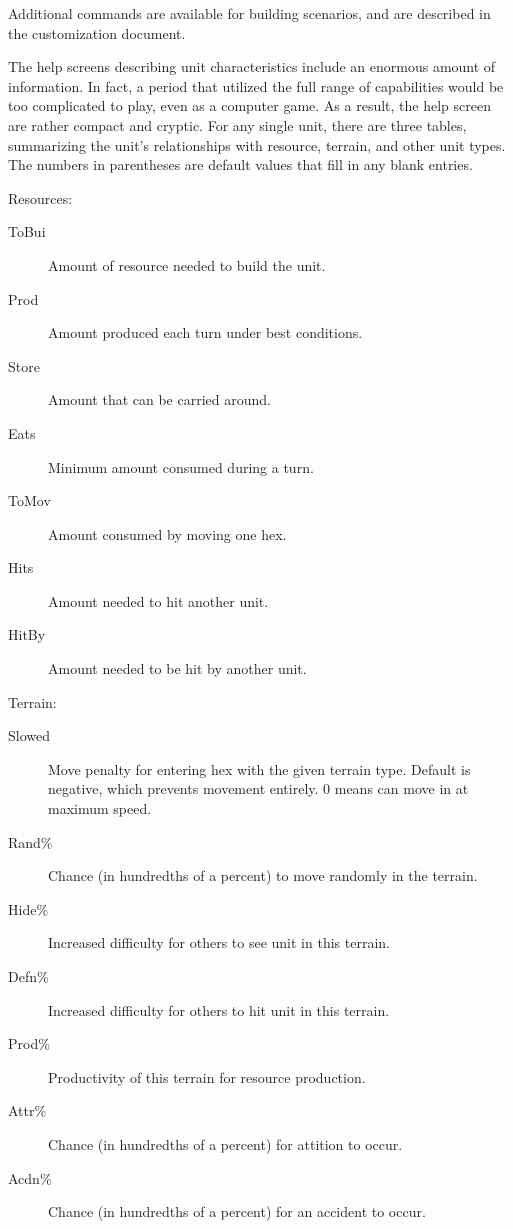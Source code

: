 Additional commands are available for building scenarios, and are described
in the customization document.
\par\noindent
The help screens describing unit characteristics include an enormous amount
of information.  In fact, a period that utilized the full range of capabilities
would be too complicated to play, even as a computer game.
As a result, the help screen are rather compact and cryptic.
For any single unit, there are three tables, summarizing the unit's
relationships with resource, terrain, and other unit types.
The numbers in parentheses are default values that fill in
any blank entries.
\par\noindent
Resources:
\begin{description}
\item[{ToBui}]
Amount of resource needed to build the unit.
\item[{Prod}]
Amount produced each turn under best conditions.
\item[{Store}]
Amount that can be carried around.
\item[{Eats}]
Minimum amount consumed during a turn.
\item[{ToMov}]
Amount consumed by moving one hex.
\item[{Hits}]
Amount needed to hit another unit.
\item[{HitBy}]
Amount needed to be hit by another unit.
\end{description}\par\noindent
Terrain:
\begin{description}
\item[{Slowed}]
Move penalty for entering hex with the given terrain type.
Default is negative, which prevents movement entirely.
0 means can move in at maximum speed.
\item[{Rand\%}]
Chance (in hundredths of a percent) to move randomly in
the terrain.
\item[{Hide\%}]
Increased difficulty for others to see unit in this terrain.
\item[{Defn\%}]
Increased difficulty for others to hit unit in this terrain.
\item[{Prod\%}]
Productivity of this terrain for resource production.
\item[{Attr\%}]
Chance (in hundredths of a percent) for attition to occur.
\item[{Acdn\%}]
Chance (in hundredths of a percent) for an accident to occur.
\end{description}\par\noindent
